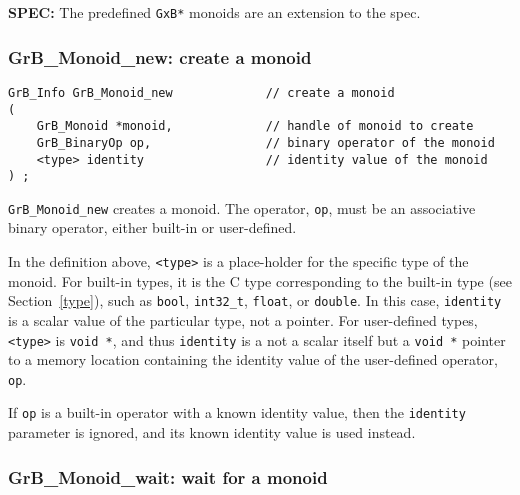 \documentclass[12pt]{article}
\begin{document}
\begin{spec}
{\bf SPEC:} The predefined \verb'GxB*' monoids are an extension to the spec.
\end{spec}

\newpage
\subsubsection{{\sf GrB\_Monoid\_new:} create a monoid}
\label{monoid_new}

\begin{mdframed}[userdefinedwidth=6in]
{\footnotesize
\begin{verbatim}
GrB_Info GrB_Monoid_new             // create a monoid
(
    GrB_Monoid *monoid,             // handle of monoid to create
    GrB_BinaryOp op,                // binary operator of the monoid
    <type> identity                 // identity value of the monoid
) ;
\end{verbatim}
} \end{mdframed}

\verb'GrB_Monoid_new' creates a monoid.  The operator, \verb'op', must be an
associative binary operator, either built-in or user-defined.

In the definition above, \verb'<type>' is a place-holder for the specific type
of the monoid.  For built-in types, it is the C type corresponding to the
built-in type (see Section~\ref{type}), such as \verb'bool', \verb'int32_t',
\verb'float', or \verb'double'.  In this case, \verb'identity' is a
scalar value of the particular type, not a pointer.  For
user-defined types, \verb'<type>' is \verb'void *', and thus \verb'identity' is
a not a scalar itself but a \verb'void *' pointer to a memory location
containing the identity value of the user-defined operator, \verb'op'.

If \verb'op' is a built-in operator with a known identity value, then the
\verb'identity' parameter is ignored, and its known identity value is used
instead.

\subsubsection{{\sf GrB\_Monoid\_wait:} wait for a monoid}
\end{document}
